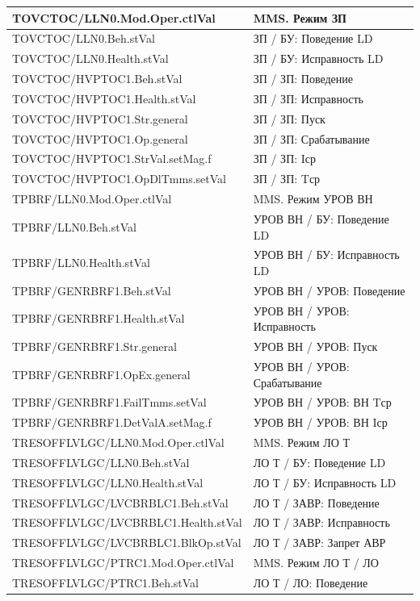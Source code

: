 \begin{longtable}{|>{\raggedright\arraybackslash}m{}|>{\raggedright\arraybackslash}m{}|}
\hline
TOVCTOC/LLN0.Mod.Oper.ctlVal & MMS. Режим ЗП \\
\hline
TOVCTOC/LLN0.Beh.stVal & ЗП / БУ: Поведение LD \\
\hline
TOVCTOC/LLN0.Health.stVal & ЗП / БУ: Исправность LD \\
\hline
TOVCTOC/HVPTOC1.Beh.stVal & ЗП / ЗП: Поведение \\
\hline
TOVCTOC/HVPTOC1.Health.stVal & ЗП / ЗП: Исправность \\
\hline
TOVCTOC/HVPTOC1.Str.general & ЗП / ЗП: Пуск \\
\hline
TOVCTOC/HVPTOC1.Op.general & ЗП / ЗП: Срабатывание \\
\hline
TOVCTOC/HVPTOC1.StrVal.setMag.f & ЗП / ЗП: Iср \\
\hline
TOVCTOC/HVPTOC1.OpDlTmms.setVal & ЗП / ЗП: Tср \\
\hline
TPBRF/LLN0.Mod.Oper.ctlVal & MMS. Режим УРОВ ВН \\
\hline
TPBRF/LLN0.Beh.stVal & УРОВ ВН / БУ: Поведение LD \\
\hline
TPBRF/LLN0.Health.stVal & УРОВ ВН / БУ: Исправность LD \\
\hline
TPBRF/GENRBRF1.Beh.stVal & УРОВ ВН / УРОВ: Поведение \\
\hline
TPBRF/GENRBRF1.Health.stVal & УРОВ ВН / УРОВ: Исправность \\
\hline
TPBRF/GENRBRF1.Str.general & УРОВ ВН / УРОВ: Пуск \\
\hline
TPBRF/GENRBRF1.OpEx.general & УРОВ ВН / УРОВ: Срабатывание \\
\hline
TPBRF/GENRBRF1.FailTmms.setVal & УРОВ ВН / УРОВ: ВН Tср \\
\hline
TPBRF/GENRBRF1.DetValA.setMag.f & УРОВ ВН / УРОВ: ВН Iср \\
\hline
TRESOFFLVLGC/LLN0.Mod.Oper.ctlVal & MMS. Режим ЛО Т \\
\hline
TRESOFFLVLGC/LLN0.Beh.stVal & ЛО Т / БУ: Поведение LD \\
\hline
TRESOFFLVLGC/LLN0.Health.stVal & ЛО Т / БУ: Исправность LD \\
\hline
TRESOFFLVLGC/LVCBRBLC1.Beh.stVal & ЛО Т / ЗАВР: Поведение \\
\hline
TRESOFFLVLGC/LVCBRBLC1.Health.stVal & ЛО Т / ЗАВР: Исправность \\
\hline
TRESOFFLVLGC/LVCBRBLC1.BlkOp.stVal & ЛО Т / ЗАВР: Запрет АВР \\
\hline
TRESOFFLVLGC/PTRC1.Mod.Oper.ctlVal & MMS. Режим ЛО Т / ЛО \\
\hline
TRESOFFLVLGC/PTRC1.Beh.stVal & ЛО Т / ЛО: Поведение \\

\end{longtable}
